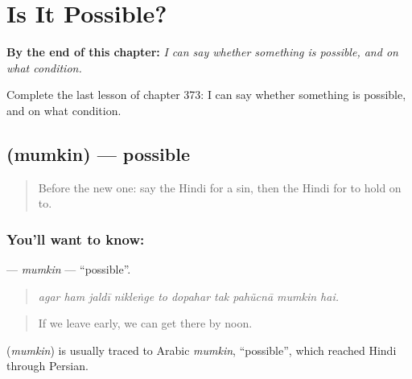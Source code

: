 
\chapter{Is It Possible?}
\label{ch:hi-is-it-possible}

\begin{chapteropening}
\textbf{By the end of this chapter:} \emph{I can say whether something is possible, and on what condition.}

Complete the last lesson of chapter 373: I can say whether something is possible, and on what condition.
\end{chapteropening}

\section[\texorpdfstring{\hi{मुमकिन} (mumkin)}{मुमकिन (mumkin)}]{ (mumkin) — possible}

\label{lesson:HI-C373-mumkin}



\begin{quote}
Before the new one: say the Hindi for a sin, then the Hindi for to hold on to.
\end{quote}

\subsection*{You'll want to know: }
\textbf{} — \emph{mumkin} — \textquotedblleft{}possible\textquotedblright{}.

\begin{quote}
         
\end{quote}

\begin{quote}
\emph{agar ham jaldī nikleṅge to dopahar tak pahũcnā mumkin hai.}
\end{quote}

\begin{quote}
If we leave early, we can get there by noon.
\end{quote}

\begin{cousinweb}
\textbf{} (\emph{mumkin}) is usually traced to Arabic \emph{mumkin}, \textquotedblleft{}possible\textquotedblright{}, which reached Hindi through Persian.
\end{cousinweb}

